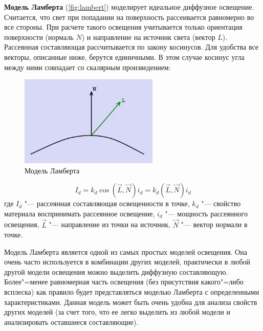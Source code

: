 \textbf{Модель Ламберта} (\autoref{fig:lambert}) моделирует идеальное диффузное освещение. Считается, что свет при попадании на поверхность рассеивается равномерно во все стороны. При расчете такого освещения учитывается только ориентация поверхности (нормаль $N$) и направление на источник света (вектор $L$). Рассеянная составляющая рассчитывается по закону косинусов. Для удобства все векторы, описанные ниже, берутся единичными. В этом случае косинус угла между ними совпадает со скалярным произведением:
\begin{figure}[H]
    \centering
    \includegraphics[width=0.59\textwidth]{src/img/lambert.jpg}
    \caption{Модель Ламберта}
    \label{fig:lambert}
\end{figure}

\begin{equation}
    I_{d} = k_{d}\cos(\vec{L}, \vec{N})i_{d} = k_{d}(\vec{L}, \vec{N})i_{d}
\end{equation}
где $I_{d}$ "--- рассеянная составляющая освещенности в точке, $k_{d}$ "--- свойство материала воспринимать рассеянное освещение, $i_{d}$ "--- мощность рассеянного освещения, $\vec{L}$ "--- направление из точки на источник, $\vec{N}$ "--- вектор нормали в точке\cite{light_models}.

Модель Ламберта является одной из самых простых моделей освещения. Она очень часто используется в комбинации других моделей, практически в любой другой модели освещения можно выделить диффузную составляющую. Более"=менее равномерная часть освещения (без присутствия какого"=либо всплеска) как правило будет представляться моделью Ламберта с определенными характеристиками. Данная модель может быть очень удобна для анализа свойств других моделей (за счет того, что ее легко выделить из любой модели и анализировать оставшиеся составляющие).

